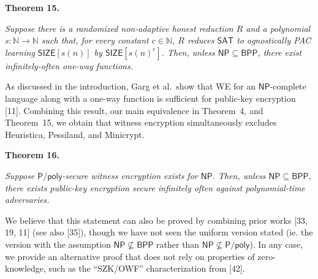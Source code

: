 

\par\medskip\noindent\textbf{
\textbf{Theorem 15}\textbf{.}
}\par



\emph{Suppose there is a randomized non-adaptive honest reduction $R$ and a polynomial $s:\mathbb{N}\to\mathbb{N}$ such that, for every constant $c\in\mathbb{N}$, $R$ reduces ${\mathsf{SAT}}$ to agnostically PAC learning ${\mathsf{SIZE}}[s(n)]$ by ${\mathsf{SIZE}}[s(n)^{c}]$. Then, unless ${\mathsf{NP}}\subseteq{\mathsf{BPP}}$, there exist infinitely-often one-way functions.}\par






As discussed in the introduction, Garg et al. show that WE for an ${\mathsf{NP}}$-complete language along with a one-way function is sufficient for public-key encryption [11]. Combining this result, our main equivalence in Theorem 4, and Theorem 15, we obtain that witness encryption simultaneously excludes Heuristica, Pessiland, and Minicrypt.\par





\par\medskip\noindent\textbf{
\textbf{Theorem 16}\textbf{.}
}\par



\emph{Suppose ${\mathsf{P}}/{\mathsf{poly}}$-secure witness encryption exists for ${\mathsf{NP}}$. Then, unless ${\mathsf{NP}}\subseteq{\mathsf{BPP}}$, there exists public-key encryption secure infinitely often against polynomial-time adversaries.}\par






We believe that this statement can also be proved by combining prior works [33, 19, 11] (see also [35]), though we have not seen the uniform version stated (ie. the version with the assumption ${\mathsf{NP}}\nsubseteq{\mathsf{BPP}}$ rather than ${\mathsf{NP}}\nsubseteq{\mathsf{P}}/{\mathsf{poly}}$). In any case, we provide an alternative proof that does not rely on properties of zero-knowledge, such as the “SZK/OWF” characterization from [42].\par




